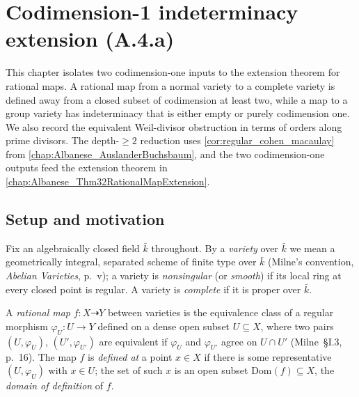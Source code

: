 
\chapter{Codimension-1 indeterminacy extension (A.4.a)}
\label{chap:Albanese_CodimOneExtension}

This chapter isolates two codimension-one inputs to the extension theorem for rational
maps.  A rational map from a normal variety to a complete variety is defined away from a
closed subset of codimension at least two, while a map to a group variety has indeterminacy
that is either empty or purely codimension one.  We also record the equivalent
Weil-divisor obstruction in terms of orders along prime divisors.
The depth-\(\geq 2\) reduction uses
\cref{cor:regular_cohen_macaulay} from
\cref{chap:Albanese_AuslanderBuchsbaum}, and the two codimension-one outputs
feed the extension theorem in \cref{chap:Albanese_Thm32RationalMapExtension}.

\section{Setup and motivation}
\label{sec:codim1_setup}

Fix an algebraically closed field \(\bar k\) throughout. By a \emph{variety} over \(\bar k\)
we mean a geometrically integral, separated scheme of finite type over \(\bar k\)
(Milne's convention, \emph{Abelian Varieties}, p.~v); a variety is \emph{nonsingular}
(or \emph{smooth}) if its local ring at every closed point is regular. A variety is
\emph{complete} if it is proper over \(\bar k\).

A \emph{rational map} \(f \colon X \dashrightarrow Y\) between varieties is the equivalence
class of a regular morphism \(\varphi_U \colon U \to Y\) defined on a dense open subset
\(U \subseteq X\), where two pairs \((U, \varphi_U)\), \((U', \varphi_{U'})\) are equivalent
if \(\varphi_U\) and \(\varphi_{U'}\) agree on \(U \cap U'\) (Milne~\S I.3, p.~16). The map \(f\)
is \emph{defined at} a point \(x \in X\) if there is some representative \((U, \varphi_U)\)
with \(x \in U\); the set of such \(x\) is an open subset \(\mathrm{Dom}(f) \subseteq X\),
the \emph{domain of definition} of \(f\).

